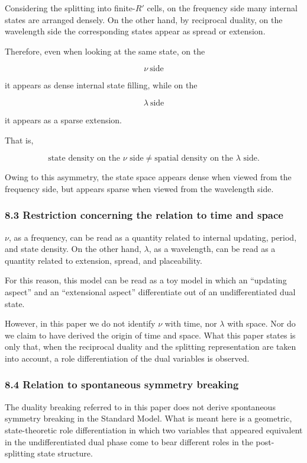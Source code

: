 \documentclass[
]{article}
\begin{document}
Considering the splitting into finite-\(R'\) cells, on the frequency
side many internal states are arranged densely. On the other hand, by
reciprocal duality, on the wavelength side the corresponding states
appear as spread or extension.

Therefore, even when looking at the same state, on the

\[
\nu\ \text{side}
\]

it appears as dense internal state filling, while on the

\[
\lambda\ \text{side}
\]

it appears as a sparse extension.

That is,

\[
\text{state density on the }\nu\text{ side}\ne\text{spatial density on the }\lambda\text{ side}.
\]

Owing to this asymmetry, the state space appears dense when viewed from
the frequency side, but appears sparse when viewed from the wavelength
side.

\subsubsection{8.3 Restriction concerning the relation to time and
space}\label{restriction-concerning-the-relation-to-time-and-space}

\(\nu\), as a frequency, can be read as a quantity related to internal
updating, period, and state density. On the other hand, \(\lambda\), as
a wavelength, can be read as a quantity related to extension, spread,
and placeability.

For this reason, this model can be read as a toy model in which an
``updating aspect'' and an ``extensional aspect'' differentiate out of
an undifferentiated dual state.

However, in this paper we do not identify \(\nu\) with time, nor
\(\lambda\) with space. Nor do we claim to have derived the origin of
time and space. What this paper states is only that, when the reciprocal
duality and the splitting representation are taken into account, a role
differentiation of the dual variables is observed.

\subsubsection{8.4 Relation to spontaneous symmetry
breaking}\label{relation-to-spontaneous-symmetry-breaking}

The duality breaking referred to in this paper does not derive
spontaneous symmetry breaking in the Standard Model. What is meant here
is a geometric, state-theoretic role differentiation in which two
variables that appeared equivalent in the undifferentiated dual phase
come to bear different roles in the post-splitting state structure.
\end{document}

